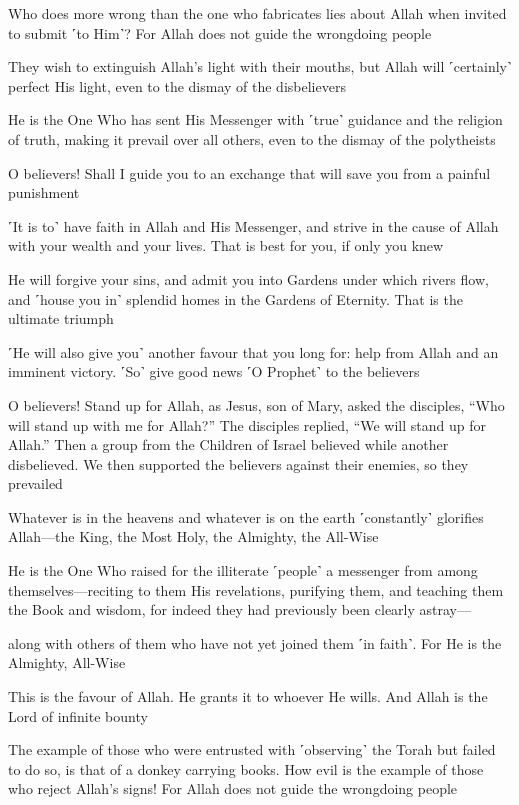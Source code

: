 Who does more wrong than the one who fabricates lies about Allah when invited to submit ˹to Him˺? For Allah does not guide the wrongdoing people

They wish to extinguish Allah’s light with their mouths, but Allah will ˹certainly˺ perfect His light, even to the dismay of the disbelievers

He is the One Who has sent His Messenger with ˹true˺ guidance and the religion of truth, making it prevail over all others, even to the dismay of the polytheists

O believers! Shall I guide you to an exchange that will save you from a painful punishment

˹It is to˺ have faith in Allah and His Messenger, and strive in the cause of Allah with your wealth and your lives. That is best for you, if only you knew

He will forgive your sins, and admit you into Gardens under which rivers flow, and ˹house you in˺ splendid homes in the Gardens of Eternity. That is the ultimate triumph

˹He will also give you˺ another favour that you long for: help from Allah and an imminent victory. ˹So˺ give good news ˹O Prophet˺ to the believers

O believers! Stand up for Allah, as Jesus, son of Mary, asked the disciples, “Who will stand up with me for Allah?” The disciples replied, “We will stand up for Allah.” Then a group from the Children of Israel believed while another disbelieved. We then supported the believers against their enemies, so they prevailed

Whatever is in the heavens and whatever is on the earth ˹constantly˺ glorifies Allah—the King, the Most Holy, the Almighty, the All-Wise

He is the One Who raised for the illiterate ˹people˺ a messenger from among themselves—reciting to them His revelations, purifying them, and teaching them the Book and wisdom, for indeed they had previously been clearly astray—

along with others of them who have not yet joined them ˹in faith˺. For He is the Almighty, All-Wise

This is the favour of Allah. He grants it to whoever He wills. And Allah is the Lord of infinite bounty

The example of those who were entrusted with ˹observing˺ the Torah but failed to do so, is that of a donkey carrying books. How evil is the example of those who reject Allah’s signs! For Allah does not guide the wrongdoing people

